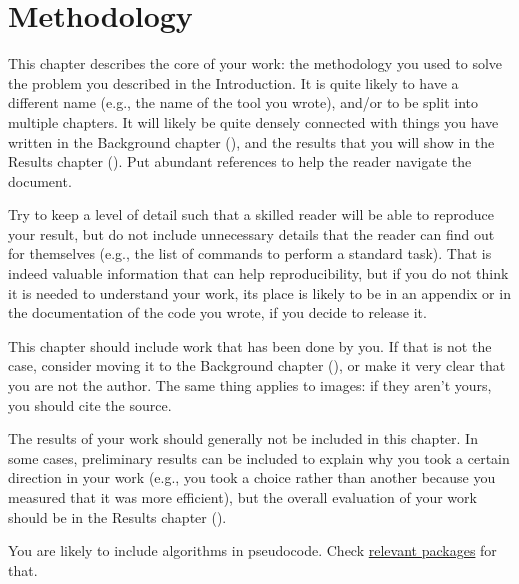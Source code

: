 \chapter{Methodology}\label{sec:method}

This chapter describes the core of your work: the methodology you used to solve the problem
you described in the Introduction. It is quite likely to have a different name (e.g., the
name of the tool you wrote), and/or to be split into multiple chapters. It will likely be quite
densely connected with things you have written in the Background chapter (),
and the results that you will show in the Results chapter (). Put abundant
references to help the reader navigate the document.

Try to keep a level of detail such that a skilled reader will be able to reproduce your result,
but do not include unnecessary details that the reader can find out for themselves (e.g., the
list of commands to perform a standard task). That is indeed valuable information that can help
reproducibility, but if you do not think it is needed to understand your work, its place is
likely to be in an appendix or in the documentation of the code you wrote, if you decide to
release it.

This chapter should include work that has been done by you. If that is not the case, consider
moving it to the Background chapter (), or make it very clear that you are
not the author. The same thing applies to images: if they aren't yours, you should cite the
source.

The results of your work should generally not be included in this chapter. In some cases,
preliminary results can be included to explain why you took a certain direction in your work
(e.g., you took a choice rather than another because you measured that it was more efficient),
but the overall evaluation of your work should be in the Results chapter ().

You are likely to include algorithms in pseudocode. Check
\href{https://www.overleaf.com/learn/latex/Algorithms}{relevant \latex packages} for that.
